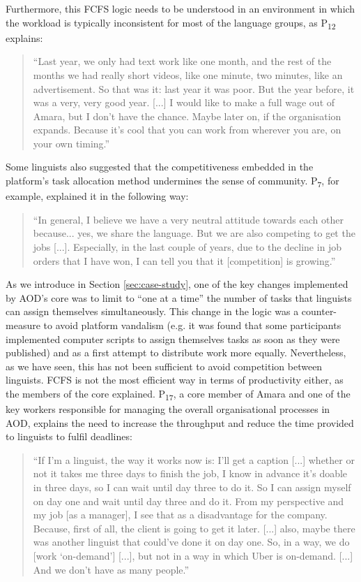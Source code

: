 Furthermore, this FCFS logic needs to be understood in an environment in which the workload is typically inconsistent for most of the language groups, as P\textsubscript{12} explains:

\begin{quote}
``Last year, we only had text work like one month, and the rest of the months we had really short videos, like one minute, two minutes, like an advertisement. So that was it: last year it was poor. But the year before, it was a very, very good year. [...] I would like to make a full wage out of Amara, but I don't have the chance. Maybe later on, if the organisation expands. Because it's cool that you can work from wherever you are, on your own timing.''
\end{quote}

Some linguists also suggested that the competitiveness embedded in the platform's task allocation method undermines the sense of community. P\textsubscript{7}, for example, explained it in the following way:

\begin{quote}
    ``In general, I believe we have a very neutral attitude towards each other because... yes, we share the language. But we are also competing to get the jobs [...]. Especially, in the last couple of years, due to the decline in job orders that I have won, I can tell you that it [competition] is growing.''
\end{quote}

As we introduce in Section \ref{sec:case-study}, one of the key changes implemented by AOD's core was to limit to ``one at a time'' the number of tasks that linguists can assign themselves simultaneously. This change in the logic was a counter-measure to avoid platform vandalism (e.g. it was found that some participants implemented computer scripts to assign themselves tasks as soon as they were published) and as a first attempt to distribute work more equally. Nevertheless, as we have seen, this has not been sufficient to avoid competition between linguists. FCFS is not the most efficient way in terms of productivity either, as the members of the core explained. P\textsubscript{17}, a core member of Amara and one of the key workers responsible for managing the overall organisational processes in AOD, explains the need to increase the throughput and reduce the time provided to linguists to fulfil deadlines:

\begin{quote}
    ``If I'm a linguist, the way it works now is: I'll get a caption [...] whether or not it takes me three days to finish the job, I know in advance it's doable in three days, so I can wait until day three to do it. So I can assign myself on day one and wait until day three and do it. From my perspective and my job [as a manager], I see that as a disadvantage for the company. Because, first of all, the client is going to get it later. [...] also, maybe there was another linguist that could've done it on day one. So, in a way, we do [work `on-demand'] [...], but not in a way in which Uber is on-demand. [...] And we don't have as many people.''
\end{quote}


